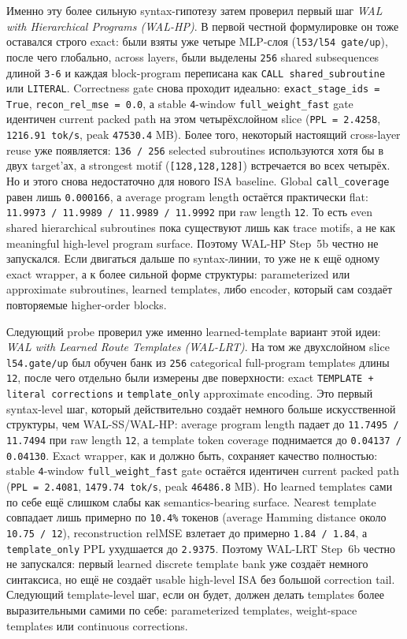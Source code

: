 \begin{itemize}[leftmargin=1.5em]
Именно эту более сильную syntax-гипотезу затем проверил первый шаг
\emph{WAL with Hierarchical Programs (WAL-HP)}. В первой честной формулировке
он тоже оставался строго exact: были взяты уже четыре MLP-слоя
(\texttt{l53/l54 gate/up}), после чего глобально, across layers, были
выделены \texttt{256} shared subsequences длиной \texttt{3-6} и каждая
block-program переписана как \texttt{CALL shared\_subroutine} или
\texttt{LITERAL}. Correctness gate снова проходит идеально:
\texttt{exact\_stage\_ids = True}, \texttt{recon\_rel\_mse = 0.0}, а stable
\texttt{4}-window \texttt{full\_weight\_fast} gate идентичен current packed
path на этом четырёхслойном slice (\texttt{PPL = 2.4258},
\texttt{1216.91 tok/s}, peak \texttt{47530.4} MB). Более того, некоторый
настоящий cross-layer reuse уже появляется: \texttt{136 / 256} selected
subroutines используются хотя бы в двух target'ах, а strongest motif
(\texttt{[128,128,128]}) встречается во всех четырёх. Но и этого снова
недостаточно для нового ISA baseline. Global \texttt{call\_coverage} равен
лишь \texttt{0.000166}, а average program length остаётся практически flat:
\texttt{11.9973 / 11.9989 / 11.9989 / 11.9992} при raw length \texttt{12}.
То есть even shared hierarchical subroutines пока существуют лишь как trace
motifs, а не как meaningful high-level program surface. Поэтому WAL-HP
Step~5b честно не запускался. Если двигаться дальше по syntax-линии, то уже
не к ещё одному exact wrapper, а к более сильной форме структуры:
parameterized или approximate subroutines, learned templates, либо encoder,
который сам создаёт повторяемые higher-order blocks.

Следующий probe проверил уже именно learned-template вариант этой идеи:
\emph{WAL with Learned Route Templates (WAL-LRT)}. На том же двухслойном
slice \texttt{l54.gate/up} был обучен банк из \texttt{256} categorical
full-program templates длины \texttt{12}, после чего отдельно были измерены
две поверхности: exact \texttt{TEMPLATE + literal corrections} и
\texttt{template\_only} approximate encoding. Это первый syntax-level шаг,
который действительно создаёт немного больше искусственной структуры, чем
WAL-SS/WAL-HP: average program length падает до
\texttt{11.7495 / 11.7494} при raw length \texttt{12}, а template token
coverage поднимается до \texttt{0.04137 / 0.04130}. Exact wrapper, как и
должно быть, сохраняет качество полностью: stable \texttt{4}-window
\texttt{full\_weight\_fast} gate остаётся идентичен current packed path
(\texttt{PPL = 2.4081}, \texttt{1479.74 tok/s}, peak \texttt{46486.8} MB).
Но learned templates сами по себе ещё слишком слабы как semantics-bearing
surface. Nearest template совпадает лишь примерно по \texttt{10.4\%} токенов
(average Hamming distance около \texttt{10.75 / 12}), reconstruction relMSE
взлетает до примерно \texttt{1.84 / 1.84}, а \texttt{template\_only} PPL
ухудшается до \texttt{2.9375}. Поэтому WAL-LRT Step~6b честно не запускался:
первый learned discrete template bank уже создаёт немного синтаксиса, но ещё
не создаёт usable high-level ISA без большой correction tail. Следующий
template-level шаг, если он будет, должен делать templates более выразительными
самими по себе: parameterized templates, weight-space templates или continuous
corrections.


\end{itemize}
